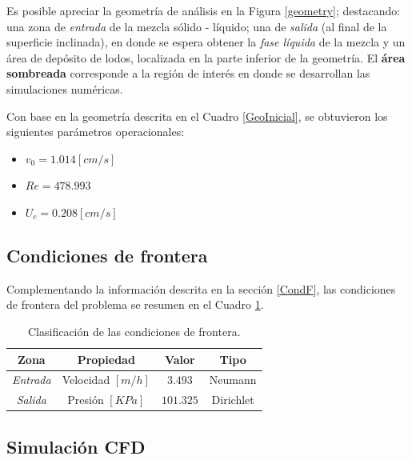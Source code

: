 \noindent
\justify

Es posible apreciar la geometr\'ia de an\'alisis en la Figura \ref{geometry}; destacando: una zona de \textit{entrada} de la mezcla s\'olido - l\'iquido; una de \textit{salida} (al final de la superficie inclinada), en donde se espera obtener la \textit{fase l\'iquida} de la mezcla y un \'area de dep\'osito de lodos, localizada en la parte inferior de la geometr\'ia. El \textbf{\'area sombreada} corresponde a la regi\'on de inter\'es en donde se desarrollan las simulaciones num\'ericas.



\noindent
\justify

Con base en la geometr\'ia descrita en el Cuadro \ref{GeoInicial}, se obtuvieron los siguientes par\'ametros operacionales:

\begin{itemize}
	\item $v_0 = 1.014 [cm/s]$
	\item $Re = 478.993$
	\item $U_c = 0.208 [cm/s]$
\end{itemize}



\subsection{Condiciones de frontera}

\noindent
\justify

Complementando la informaci\'on descrita en la secci\'on \ref{CondF}, las condiciones de frontera del problema se resumen en el Cuadro \ref{condFr}.

\begin{table}[h!]
	\centering
	\begin{tabular}{|c|c|c|c|}
		\hline
		\textbf{Zona} & \textbf{Propiedad} & \textbf{Valor}  & \textbf{Tipo} \\ \hline
		\textit{Entrada} & Velocidad $[m/h]$ & $3.493$ & Neumann \\ \hline
		\textit{Salida} & Presi\'on $[KPa]$ & $101.325$ & Dirichlet \\ \hline
	\end{tabular}
	\caption{Clasificaci\'on de las condiciones de frontera.}
	\label{condFr}
\end{table}

\newpage

\subsection{Simulaci\'on CFD} \label{CFD:resultados}

